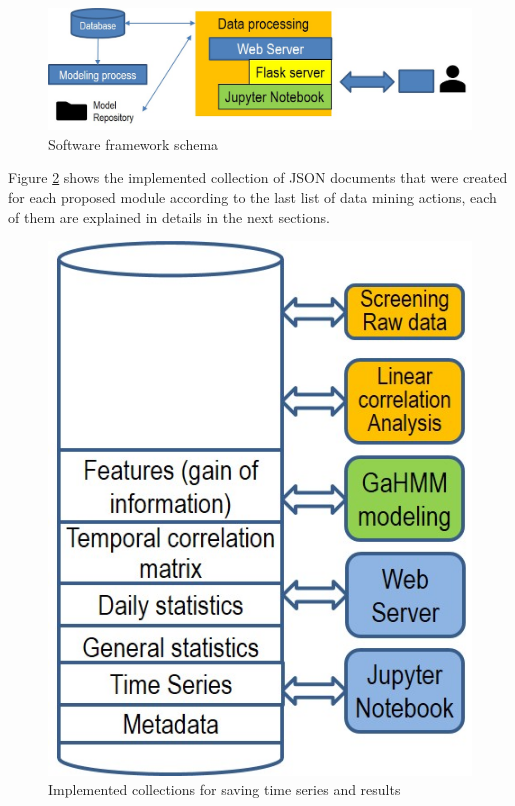 \begin{figure}[h!]
  \vspace{0.5em} %
  \includegraphics[scale=0.4]{Figures/framework.jpg}
  \caption{Software framework schema}
  \label{fig:framework}
\end{figure}

Figure \ref{fig:structure} shows the implemented collection of JSON documents that were created for each proposed module according to the last list of data mining actions, each of them are explained in details in the next sections.

\begin{figure}[h!]
  \vspace{0.5em} %
  \includegraphics[scale=0.4]{Figures/database_structure.jpg}
  \caption{Implemented collections for saving time series and results}
  \label{fig:structure}
\end{figure} 
 
